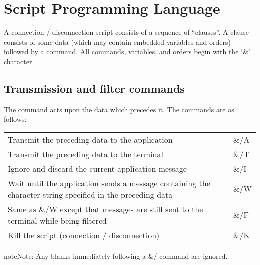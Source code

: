 \documentclass[letterpaper,10pt,english]{sphinxmanual}
\begin{document}
\section{Script Programming Language}
\label{\detokenize{connectivity_guide:index-117}}\label{\detokenize{connectivity_guide:script-programming-language}}
A connection / disconnection script consists of a sequence of “clauses”. A clause consists of some data (which may contain embedded variables and orders) followed by a command. All commands, variables, and orders begin with the ‘\&’ character.


\subsection{Transmission and filter commands}
\label{\detokenize{connectivity_guide:transmission-and-filter-commands}}\label{\detokenize{connectivity_guide:index-118}}
The command acts upon the data which precedes it. The commands are as follows:-


\begin{savenotes}\sphinxattablestart
\centering
\begin{tabulary}{\linewidth}[t]{|T|T|}
\hline
{}\relax &\relax \\
\hline
Transmit the preceding data to the application
&
\&/A
\\
\hline
Transmit the preceding data to the terminal
&
\&/T
\\
\hline
Ignore and discard the current application message
&
\&/I
\\
\hline
Wait until the application sends a message containing the character string specified in the preceding data
&
\&/W
\\
\hline
Same as \&/W except that messages are still sent to the terminal while being filtered
&
\&/F
\\
\hline
Kill the script (connection / disconnection)
&
\&/K
\\
\hline
\end{tabulary}
\par
\sphinxattableend\end{savenotes}

\begin{sphinxadmonition}{note}{Note:}
Any blanks immediately following a \&/ command are ignored.
\end{sphinxadmonition}
\end{document}
